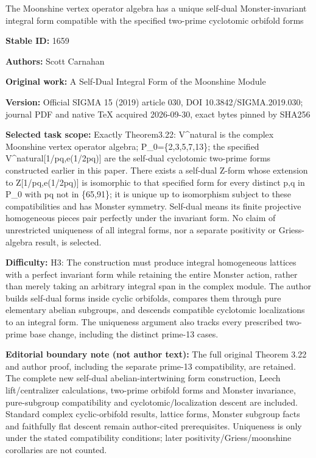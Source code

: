 \documentclass[11pt]{article}
\theoremstyle{definition}
\begin{document}
\begin{center}\Large The Moonshine vertex operator algebra has a unique self-dual Monster-invariant integral form compatible with the specified two-prime cyclotomic orbifold forms\end{center}
\noindent\textbf{Stable ID:} 1659\par
\noindent\textbf{Authors:} Scott Carnahan\par
\noindent\textbf{Original work:} A Self-Dual Integral Form of the Moonshine Module\par
\noindent\textbf{Version:} Official SIGMA 15 (2019) article 030, DOI 10.3842/SIGMA.2019.030; journal PDF and native TeX acquired 2026-09-30, exact bytes pinned by SHA256\par
\noindent\textbf{Selected task scope:} Exactly Theorem3.22: V\textasciicircum{}natural is the complex Moonshine vertex operator algebra; P\_0=\{2,3,5,7,13\}; the specified V\textasciicircum{}natural[1/pq,e(1/2pq)] are the self-dual cyclotomic two-prime forms constructed earlier in this paper. There exists a self-dual Z-form whose extension to Z[1/pq,e(1/2pq)] is isomorphic to that specified form for every distinct p,q in P\_0 with pq not in \{65,91\}; it is unique up to isomorphism subject to these compatibilities and has Monster symmetry. Self-dual means its finite projective homogeneous pieces pair perfectly under the invariant form. No claim of unrestricted uniqueness of all integral forms, nor a separate positivity or Griess-algebra result, is selected.\par
\noindent\textbf{Difficulty:} H3: The construction must produce integral homogeneous lattices with a perfect invariant form while retaining the entire Monster action, rather than merely taking an arbitrary integral span in the complex module. The author builds self-dual forms inside cyclic orbifolds, compares them through pure elementary abelian subgroups, and descends compatible cyclotomic localizations to an integral form. The uniqueness argument also tracks every prescribed two-prime base change, including the distinct prime-13 cases.\par
\noindent\textbf{Editorial boundary note (not author text):} The full original Theorem 3.22 and author proof, including the separate prime-13 compatibility, are retained. The complete new self-dual abelian-intertwining form construction, Leech lift/centralizer calculations, two-prime orbifold forms and Monster invariance, pure-subgroup compatibility and cyclotomic/localization descent are included. Standard complex cyclic-orbifold results, lattice forms, Monster subgroup facts and faithfully flat descent remain author-cited prerequisites. Uniqueness is only under the stated compatibility conditions; later positivity/Griess/moonshine corollaries are not counted.\par
\end{document}
